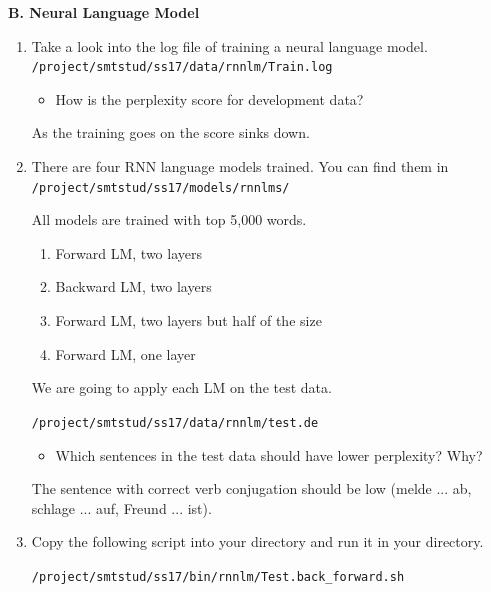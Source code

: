 \documentclass[12pt,fleqn]{article}
\begin{document}
\newpage 

\vspace{0.5cm} 
\textbf{B. Neural Language Model} \\ 

\begin{enumerate} 

\item Take a look into the log file of training a neural language model. \\ 
\texttt{/project/smtstud/ss17/data/rnnlm/Train.log} \\ 

\begin{itemize} 
 \item How is the perplexity score for development data? 
\end{itemize}

As the training goes on the score sinks down. 

\item There are four RNN language models trained. You can find them in \\ 
\texttt{/project/smtstud/ss17/models/rnnlms/} 

All models are trained with top 5,000 words. 
\begin{enumerate} 
 \item Forward LM, two layers 
 \item Backward LM, two layers 
 \item Forward LM, two layers but half of the size  
 \item Forward LM, one layer 
\end{enumerate}

We are going to apply each LM on the test data. 

\texttt{/project/smtstud/ss17/data/rnnlm/test.de} \\ 

\begin{itemize} 
 \item Which sentences in the test data should have lower perplexity? Why? 
\end{itemize}

The sentence with correct verb conjugation should be low (melde ... ab, schlage ... auf, Freund ... ist). 

\newpage 

\item Copy the following script into your directory and run it in your directory. 

\texttt{/project/smtstud/ss17/bin/rnnlm/Test.back\_forward.sh} 


\end{enumerate}
\end{document}

